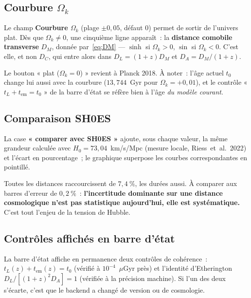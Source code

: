 \documentclass[11pt,a4paper,openany]{report}
\newcommand{\Hzero}{H_{0}}
\newcommand{\Ok}{\Omega_{k}}
\begin{document}
\subsection{Courbure $\Ok$}

\begin{tcolorbox}[gui]
Le champ \textbf{Courbure $\Ok$} (plage $\pm0{,}05$, défaut $0$) permet de
sortir de l'univers plat. Dès que $\Ok \ne 0$, une cinquième ligne apparaît~:
la \textbf{distance comobile transverse} $D_{M}$, donnée
par~\eqref{eq:DM} --- $\sinh$ si $\Ok>0$, $\sin$ si $\Ok<0$. C'est elle, et
non $D_{C}$, qui entre alors dans $D_{L} = (1+z)D_{M}$ et
$D_{A} = D_{M}/(1+z)$.

\medskip
Le bouton « plat ($\Ok = 0$) » revient à Planck 2018. À noter~: l'âge actuel
$t_{0}$ change lui aussi avec la courbure ($13{,}744$~Gyr pour
$\Ok = +0{,}01$), et le contrôle « $t_L + t_{\text{em}} = t_{0}$ » de la barre
d'état se réfère bien à l'âge \emph{du modèle courant}.
\end{tcolorbox}

\subsection{Comparaison SH0ES}

\begin{tcolorbox}[gui]
La case \textbf{« comparer avec SH0ES »} ajoute, sous chaque valeur, la même
grandeur calculée avec $\Hzero = 73{,}04$~km/s/Mpc (mesure locale,
Riess~et~al.~2022) et l'écart en pourcentage~; le graphique superpose les
courbes correspondantes en pointillé.

\medskip
Toutes les distances raccourcissent de $7{,}4~\%$, les durées aussi. À
comparer aux barres d'erreur de $0{,}2~\%$~: \textbf{l'incertitude dominante
sur une distance cosmologique n'est pas statistique aujourd'hui, elle est
systématique.} C'est tout l'enjeu de la tension de Hubble.
\end{tcolorbox}

\subsection{Contrôles affichés en barre d'état}

\begin{tcolorbox}[gui]
La barre d'état affiche en permanence deux contrôles de cohérence~:
$t_{L}(z) + t_{\text{em}}(z) = t_{0}$ (vérifié à $10^{-4}$~$\mu$Gyr près) et
l'identité d'Etherington $D_{L}/[(1+z)^{2}D_{A}] = 1$ (vérifiée à la précision
machine). Si l'un des deux s'écarte, c'est que le backend a changé de version
ou de cosmologie.
\end{tcolorbox}
\end{document}
